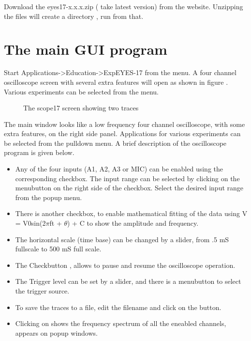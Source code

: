 \documentclass[a4paper,12pt,english]{sphinxmanual}
\begin{document}
Download the eyes17-x.x.x.zip ( take latest version) from the website.
Unzipping the files will create a directory , run
 from that.


\chapter{The main GUI program}
\label{\detokenize{1.4:the-main-gui-program}}\label{\detokenize{1.4::doc}}
Start Applications-\textgreater{}Education-\textgreater{}ExpEYES-17 from the menu. A four channel
oscilloscope screen with several extra features will open as shown in
figure {\hyperref[\detokenize{1.4:the-scope17-screen}]{}}. Various experiments can be
selected from the menu.

\begin{figure}[htbp]
\centering
\capstart

\noindent{}
\caption{The scope17 screen showing two traces}\label{\detokenize{1.4:id1}}\label{\detokenize{1.4:the-scope17-screen}}\end{figure}

The main window looks like a low frequency four channel oscilloscope,
with some extra features, on the right side panel. Applications for
various experiments can be selected from the pulldown menu. A brief
description of the oscilloscope program is given below.
\begin{itemize}
\item {} 
Any of the four inputs (A1, A2, A3 or MIC) can be enabled using the
corresponding checkbox. The input range can be selected by clicking
on the menubutton on the right side of the checkbox. Select the
desired input range from the popup menu.

\item {} 
There is another checkbox, to enable mathematical fitting of the data
using V = V0sin(2\(\pi\)ft + \(\theta\)) + C to show the amplitude and
frequency.

\item {} 
The horizontal scale (time base) can be changed by a slider, from .5
mS fullscale to 500 mS full scale.

\item {} 
The Checkbutton , allows to pause and resume the
oscilloscope operation.

\item {} 
The Trigger level can be set by a slider, and there is a menubutton
to select the trigger source.

\item {} 
To save the traces to a file, edit the filename and click on the
 button.

\item {} 
Clicking on  shows the frequency spectrum of all the eneabled
channels, appears on popup windows.

\end{itemize}
\end{document}
